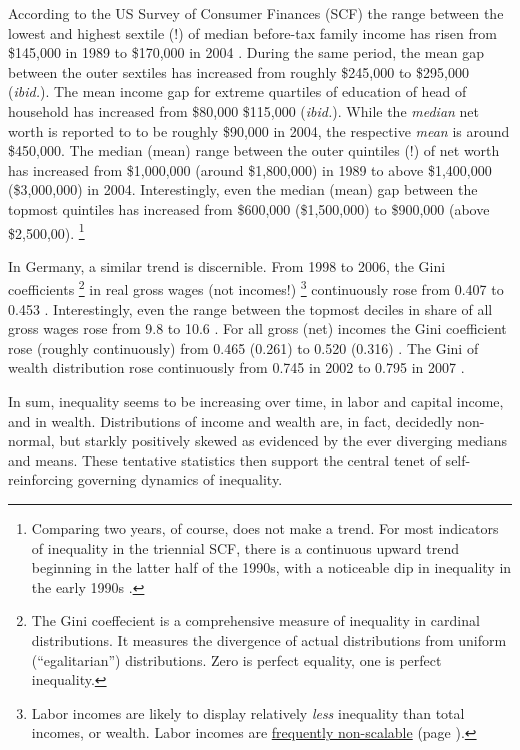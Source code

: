According to the US Survey of Consumer Finances (SCF) the range between the lowest and highest sextile (!) of median before-tax family income has risen from \$145,000 in 1989 to \$170,000 in 2004 \citep{Bucks2006}.
During the same period, the mean gap between the outer sextiles has increased from roughly \$245,000 to \$295,000 (\emph{ibid.}).
The mean income gap for extreme quartiles of education of head of household has increased from \$80,000 \$115,000 (\emph{ibid.}).
While the \emph{median} net worth is reported to to be roughly \$90,000 in 2004, the respective \emph{mean} is around \$450,000.
The median (mean) range between the outer quintiles (!) of net worth has increased from \$1,000,000 (around \$1,800,000) in 1989 to above \$1,400,000 (\$3,000,000) in 2004.
Interestingly, even the median (mean) gap between the topmost quintiles has increased from \$600,000 (\$1,500,000) to \$900,000 (above \$2,500,00).
\footnote{
	Comparing two years, of course, does not make a trend.
	For most indicators of inequality in the triennial SCF, there is a continuous upward trend beginning in the latter half of the 1990s, with a noticeable dip in inequality in the early 1990s \citep{Bucks2006}.
}

In Germany, a similar trend is discernible.
From 1998 to 2006, the Gini coefficients
\footnote{
	The Gini coeffecient is a comprehensive measure of inequality in cardinal distributions.
	It measures the divergence of actual distributions from uniform (``egalitarian'') distributions.
	Zero is perfect equality, one is perfect inequality.
}
in real gross wages (not incomes!)
\footnote{
	Labor incomes are likely to display relatively \emph{less} inequality than total incomes, or wealth.
	Labor incomes are \hyperref[sec:winner-take-all]{frequently non-scalable} (page \pageref{sec:winner-take-all}).
}
continuously rose from 0.407 to 0.453 \citep[14]{Bundesregierung2006}.
Interestingly, even the range between the topmost deciles in share of all gross wages rose from 9.8 to 10.6 \citep[64]{Grabka2007a}.
For all gross (net) incomes the Gini coefficient rose (roughly continuously) from 0.465 (0.261) to 0.520 (0.316) \citeyearpar[82]{Grabka2007a}.
The Gini of wealth distribution rose continuously from 0.745 in 2002 to 0.795 in 2007 \citeyearpar[138]{Grabka2007a}.

In sum, inequality seems to be increasing over time, in labor and capital income, and in wealth.
Distributions of income and wealth are, in fact, decidedly non-normal, but starkly positively skewed as evidenced by the ever diverging medians and means.
These tentative statistics then support the central tenet of self-reinforcing governing dynamics of inequality.

